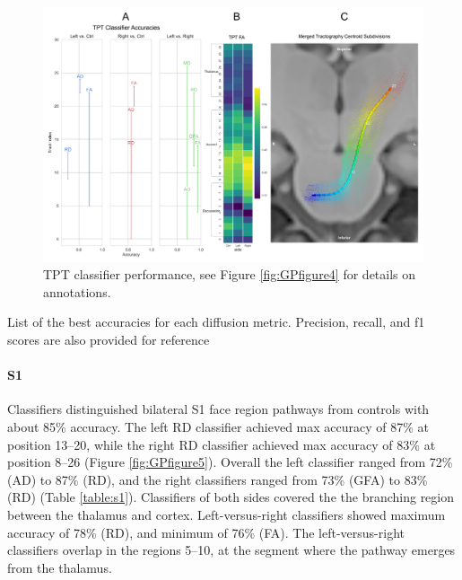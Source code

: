 \begin{figure}[ht]
\centering
\includegraphics[width=\linewidth]{figure-GP-TPT.pdf}
\caption{TPT classifier performance, see Figure \ref{fig:GPfigure4} for details on annotations.}
\label{fig:GPfigureTPT}
\end{figure}

\begin{table}[ht]
\centering
{}
\caption*{List of the best accuracies for each diffusion metric. Precision, recall, and f1 scores are also provided for reference}
\label{table:tpt}
\end{table}

\paragraph{S1}
Classifiers distinguished bilateral S1 face region pathways from controls with about 85\% accuracy. The left RD classifier achieved max accuracy of 87\% at position 13--20, while the right RD classifier achieved max accuracy of 83\% at position 8--26 (Figure \ref{fig:GPfigure5}). Overall the left classifier ranged from 72\% (AD) to 87\% (RD), and the right classifiers ranged from 73\% (GFA) to 83\% (RD) (Table \ref{table:s1}). Classifiers of both sides covered the the branching region between the thalamus and cortex. Left-versus-right classifiers showed maximum accuracy of 78\% (RD), and minimum of 76\% (FA). The left-versus-right classifiers overlap in the regions 5--10, at the segment where the pathway emerges from the thalamus.

